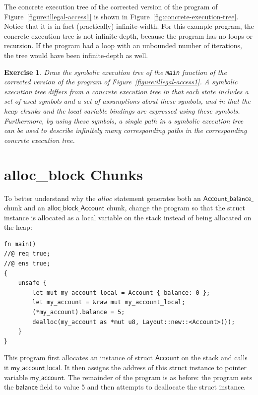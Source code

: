 \documentclass{article}
\newtheorem{exercise}{Exercise}
\begin{document}
The concrete execution tree of the corrected version of the program of Figure~\ref{figure:illegal-access1} is shown in Figure~\ref{fig:concrete-execution-tree}. Notice that it is in fact (practically) infinite-width. For this example program, the concrete execution tree is not infinite-depth, because the program has no loops or recursion. If the program had a loop with an unbounded number of iterations, the tree would have been infinite-depth as well.

\begin{exercise}\label{exercise:symex-tree}
Draw the symbolic execution tree of the \lstinline|main| function of the corrected version of the program of Figure~\ref{figure:illegal-access1}. A symbolic execution tree differs from a concrete execution tree in that each state includes a set of used \emph{symbols} and a set of \emph{assumptions} about these symbols, and in that the heap chunks and the local variable bindings are expressed using these symbols. Furthermore, by using these symbols, a single path in a symbolic execution tree can be used to describe infinitely many corresponding paths in the corresponding concrete execution tree.
\end{exercise}

\section{alloc\_block Chunks}\label{section:malloc_block}

To better understand why the $\mathit{alloc}$ statement
generates both an $\mathsf{Account\_balance\_}$ chunk and an
$\mathsf{alloc\_}$\-$\mathsf{block\_Account}$ chunk, change
the program so that the struct instance is allocated as a local
variable on the stack instead of being allocated on the heap:
\begin{lstlisting}
fn main()
//@ req true;
//@ ens true;
{
    unsafe {
        let mut my_account_local = Account { balance: 0 };
        let my_account = &raw mut my_account_local;
        (*my_account).balance = 5;
        dealloc(my_account as *mut u8, Layout::new::<Account>());
    }
}
\end{lstlisting}
This program first allocates an instance of struct
$\mathsf{Account}$ on the stack and calls it
$\mathsf{my\_account\_local}$. It then assigns the address of this
struct instance to pointer variable $\mathsf{my\_account}$. The
remainder of the program is as before: the program sets
the $\mathsf{balance}$ field to value 5 and then attempts to
deallocate the struct instance.
\end{document}
